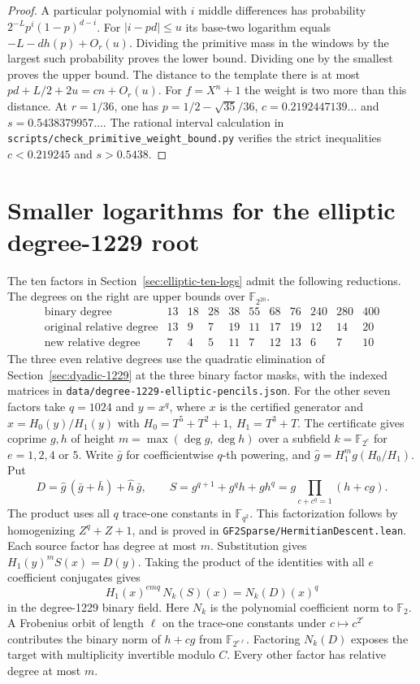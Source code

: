 \documentclass[11pt]{article}
\newcommand{\F}{\mathbb F_2}
\begin{document}
\begin{proof}
A particular polynomial with \(i\) middle differences has probability
\(2^{-L}p^i(1-p)^{d-i}\). For \(|i-pd|\le u\) its base-two logarithm
equals \(-L-dh(p)+O_r(u)\). Dividing the primitive mass in the
windows by the largest such probability proves the lower bound.
Dividing one by the smallest proves the upper bound.
The distance to the template there is at most \(pd+L/2+2u=cn+O_r(u)\).
For \(f=X^n+1\) the weight is two more than this distance.
At \(r=1/36\), one has \(p=1/2-\sqrt{35}/36\),
\(c=0.2192447139\ldots\) and \(s=0.5438379957\ldots\).
The rational interval calculation in
\nolinkurl{scripts/check_primitive_weight_bound.py} verifies the
strict inequalities \(c<0.219245\) and \(s>0.5438\).
\end{proof}

\section{Smaller logarithms for the elliptic degree-1229 root}
\label{sec:elliptic-small-pencils}
The ten factors in Section~\ref{sec:elliptic-ten-logs} admit the
following reductions. The degrees on the right are upper bounds
over \(\mathbb F_{2^{20}}\).
\[
\begin{array}{c|rrrrrrrrrr}
\text{binary degree}&13&18&28&38&55&68&76&240&280&400\\
\text{original relative degree}&13&9&7&19&11&17&19&12&14&20\\
\text{new relative degree}&7&4&5&11&7&12&13&6&7&10
\end{array}
\]
The three even relative degrees use the quadratic elimination of
Section~\ref{sec:dyadic-1229} at the three binary factor masks,
with the indexed matrices in
\nolinkurl{data/degree-1229-elliptic-pencils.json}.
For the other seven factors take \(q=1024\) and \(y=x^q\), where \(x\)
is the certified generator and \(x=H_0(y)/H_1(y)\) with
\(H_0=T^5+T^2+1,\ H_1=T^3+T\). The certificate gives coprime
\(g,h\) of height \(m=\max(\deg g,\deg h)\) over a subfield
\(k=\mathbb F_{2^e}\) for \(e=1,2,4\) or \(5\).
Write \(\bar g\) for coefficientwise \(q\)-th powering, and
\(\widehat g=H_1^m g(H_0/H_1)\). Put
\[
 D=\widehat g\,(\bar g+\bar h)+\widehat h\,\bar g,\qquad
 S=g^{q+1}+g^q h+gh^q
   =g\!\!\prod_{c+c^q=1}\!(h+cg).
\]
The product uses all \(q\) trace-one constants in
\(\mathbb F_{q^2}\). This factorization follows by homogenizing
\(Z^q+Z+1\), and is proved in \nolinkurl{GF2Sparse/HermitianDescent.lean}.
Each source factor has degree at most \(m\). Substitution gives
\(H_1(y)^m S(x)=D(y)\). Taking the product of the identities with
all \(e\) coefficient conjugates gives
\[
     H_1(x)^{emq}\,N_k(S)(x)=N_k(D)(x)^q
\]
in the degree-1229 binary field. Here \(N_k\) is the polynomial
coefficient norm to \(\F\). A Frobenius orbit of length \(\ell\)
on the trace-one constants under \(c\mapsto c^{2^e}\) contributes
the binary norm of \(h+cg\) from \(\mathbb F_{2^{e\ell}}\).
Factoring \(N_k(D)\) exposes the target with multiplicity invertible
modulo \(C\). Every other factor has relative degree at most \(m\).
\end{document}
